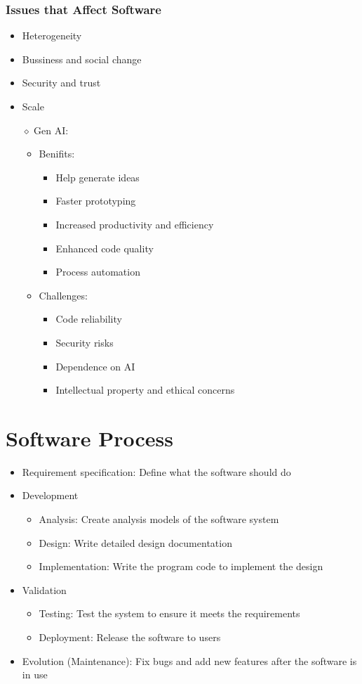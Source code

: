 \documentclass[12pt,openany]{book}
\begin{document}
\subsubsection{Issues that Affect Software}
\begin{itemize}
    \item Heterogeneity
    \item Bussiness and social change
    \item Security and trust
    \item Scale
    \item[$\diamond$] Gen AI:
    \begin{itemize}
        \item Benifits:
        \begin{itemize}
            \item Help generate ideas
            \item Faster prototyping
            \item  Increased productivity and efficiency
            \item Enhanced code quality
            \item Process automation
        \end{itemize}
        \item Challenges:
        \begin{itemize}
            \item Code reliability
            \item Security risks
            \item Dependence on AI
            \item Intellectual property and ethical concerns
        \end{itemize}
    \end{itemize}
\end{itemize}

\section{Software Process}
\begin{itemize}
    \item Requirement specification: Define what the software should do
    \item Development
    \begin{itemize}
        \item Analysis: Create analysis models of the software system
        \item Design: Write detailed design documentation
        \item Implementation: Write the program code to implement the design
    \end{itemize}
    \item Validation
    \begin{itemize}
        \item Testing: Test the system to ensure it meets the requirements
        \item Deployment: Release the software to users
    \end{itemize}
    \item Evolution (Maintenance): Fix bugs and add new features after the software is in use
\end{itemize}
\end{document}
